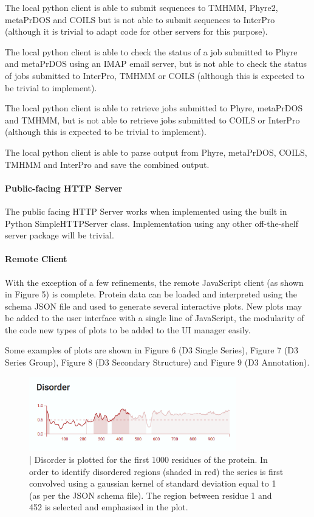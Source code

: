 \documentclass[fleqn,10pt]{article} %
\begin{document}
The local python client is able to submit sequences to TMHMM, Phyre2, metaPrDOS and COILS but is not able to submit sequences to InterPro (although it is trivial to adapt code for other servers for this purpose).

The local python client is able to check the status of a job submitted to Phyre and metaPrDOS using an IMAP email server, but is not able to check the status of jobs submitted to InterPro, TMHMM or COILS (although this is expected to be trivial to implement).

The local python client is able to retrieve jobs submitted to Phyre, metaPrDOS and TMHMM, but is not able to retrieve jobs submitted to COILS or InterPro (although this is expected to be trivial to implement).

The local python client is able to parse output from Phyre, metaPrDOS, COILS, TMHMM and InterPro and save the combined output.

\paragraph{Public-facing HTTP Server}

The public facing HTTP Server works when implemented using the built in Python SimpleHTTPServer class. Implementation using any other off-the-shelf server package will be trivial.

\paragraph{Remote Client}

With the exception of a few refinements, the remote JavaScript client (as shown in Figure 5) is complete. Protein data can be loaded and interpreted using the schema JSON file and used to generate several interactive plots. New plots may be added to the user interface with a single line of JavaScript, the modularity of the code new types of plots to be added to the UI manager easily.

Some examples of plots are shown in Figure 6 (D3 Single Series), Figure 7 (D3 Series Group), Figure 8 (D3 Secondary Structure) and Figure 9 (D3 Annotation). 

\begin{figure}
\includegraphics[width=9cm]{figs/seriesplot}
\caption{ | Disorder is plotted for the first 1000 residues of the protein. In order to identify disordered regions (shaded in red) the series is first convolved using a gaussian kernel of standard deviation equal to 1 (as per the JSON schema file). The region between residue 1 and 452 is selected and emphasised in the plot.}
\end{figure}
\end{document}
